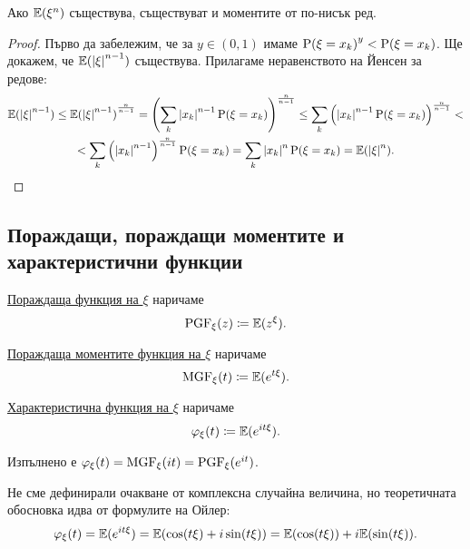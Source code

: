 \documentclass[numbers=endperiod, DIV=15, bibliography=totocnumbered]{scrartcl}
\begin{document}
\begin{proposition}\label{thm:lower-order-moments}
  Ако $\mathbb{E}(\xi^n)$ съществува, съществуват и моментите от по-нисък ред.
\end{proposition}
\begin{proof}
  Първо да забележим, че за $y \in (0, 1)$ имаме ${\operatorname{P}(\xi = x_k)}^y < \operatorname{P}(\xi = x_k)$. Ще докажем, че $\mathbb{E}({\left\vert \xi \right\vert}^{n-1})$ съществува. Прилагаме неравенството на Йенсен за редове:
  \begin{multline*}
    \mathbb{E}({\left\vert \xi \right\vert}^{n-1})
    \leq
    {\mathbb{E}({\left\vert \xi \right\vert}^{n-1})}^{\frac n {n-1}}
    =
    {\left( \sum_k {\left\vert x_k \right\vert}^{n-1} \operatorname{P}(\xi = x_k) \right)}^{\frac n {n-1}}
    \leq
    \sum_k {\left({\left\vert x_k \right\vert}^{n-1} \operatorname{P}(\xi = x_k) \right)}^{\frac n {n-1}}
    < \\ <
    \sum_k {\left({\left\vert x_k \right\vert}^{n-1}\right)}^{\frac n {n-1}} \operatorname{P}(\xi = x_k)
    =
    \sum_k {\left\vert x_k \right\vert}^n \operatorname{P}(\xi = x_k)
    =
    \mathbb{E}({\left\vert \xi \right\vert}^n).
  \end{multline*}
\end{proof}

\subsection{Пораждащи, пораждащи моментите и характеристични функции}

\begin{definition}
  \uline{Пораждаща функция на $\xi$} наричаме
  \begin{displaymath}
    \operatorname{PGF}_\xi (z) \coloneqq \mathbb{E}(z^\xi).
  \end{displaymath}

  \uline{Пораждаща моментите функция на $\xi$} наричаме
  \begin{displaymath}
    \operatorname{MGF}_\xi (t) \coloneqq \mathbb{E}(e^{t\xi}).
  \end{displaymath}

  \uline{Характеристична функция на $\xi$} наричаме
  \begin{displaymath}
    \varphi_\xi (t) \coloneqq \mathbb{E}(e^{it\xi}).
  \end{displaymath}

  Изпълнено е $\varphi_\xi(t) = \operatorname{MGF}_\xi(it) = \operatorname{PGF}_\xi(e^{it})$.
\end{definition}

\begin{note}
  Не сме дефинирали очакване от комплексна случайна величина, но теоретичната обосновка идва от формулите на Ойлер:
  \begin{displaymath}
    \varphi_\xi (t)
    =
    \mathbb{E}(e^{it\xi})
    =
    \mathbb{E}(\cos(t\xi) + i\sin(t\xi))
    =
    \mathbb{E}(\cos(t\xi)) + i \mathbb{E}(\sin(t\xi)).
  \end{displaymath}
\end{note}
\end{document}
